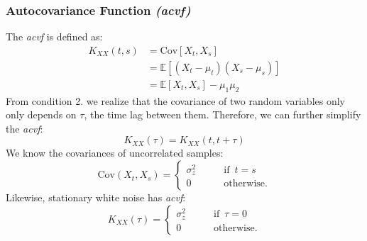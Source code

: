 \documentclass{article}
\begin{document}
\subsubsection{Autocovariance Function \emph{(acvf)}}
The \emph{acvf} is defined as:
\begin{align}
    K_{XX}(t, s) &= \text{Cov}[X_t, X_s]\nonumber\\
    &= \mathbb{E}[(X_t-\mu_t)(X_s-\mu_s)]\nonumber\\
    &= \mathbb{E}[X_t, X_s]-\mu_1\mu_2\nonumber
\end{align}
From condition 2. we realize that the covariance of two random variables only only depends on $\tau$, the time lag between them. Therefore, we can further simplify the \emph{acvf}:
\begin{equation}\label{acvf}
    K_{XX}(\tau) = K_{XX}(t, t+\tau)
\end{equation}
We know the covariances of uncorrelated samples:
\begin{equation}
    \text{Cov}(X_t, X_s) = \begin{cases}
        \sigma_z^2\qquad &\text{if } \, t=s\\
        0 \qquad &\text{otherwise.}
    \end{cases}\nonumber
\end{equation}
Likewise, stationary white noise has \emph{acvf}:
\begin{equation}
    K_{XX}(\tau) = \begin{cases}
        \sigma_z^2\qquad &\text{if } \, \tau=0\\
        0 \qquad &\text{otherwise.}
    \end{cases}\nonumber
\end{equation}
\end{document}
